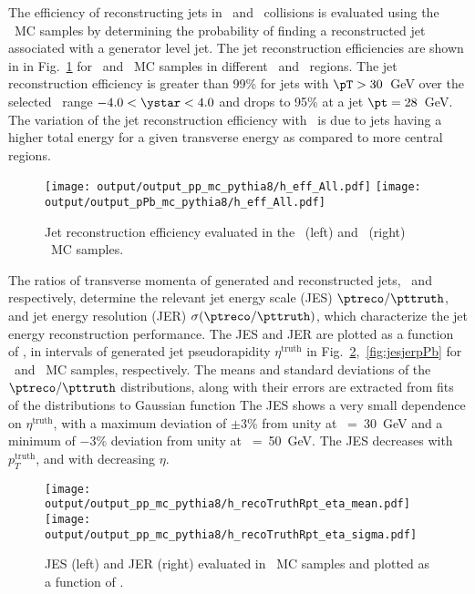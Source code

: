 The efficiency of reconstructing jets in \pp\ and \pPb\ collisions is evaluated using the \pythiaeight\ MC samples by determining the probability of finding a reconstructed jet associated with a generator level jet. The jet reconstruction efficiencies are shown in in Fig.~\ref{fig:jetrecoeff} for \pp\ and \pPb\ MC samples in different \ystar\ and \pT\ regions. The jet reconstruction efficiency is greater than 99\% for jets with $\pT>30$~GeV over the selected \ystar\ range $-4.0<\ystar<4.0$ and drops to 95\% at a jet $\pt = 28$~GeV. The variation of the jet reconstruction efficiency with \ystar\ is due to jets having a higher total energy for a given transverse energy as compared to more central regions.
  
\begin{figure}
	\centerline{
		\texttt{[image: output/output\_pp\_mc\_pythia8/h\_eff\_All.pdf]}
		\texttt{[image: output/output\_pPb\_mc\_pythia8/h\_eff\_All.pdf]}  
	}
	\caption{Jet reconstruction efficiency evaluated in the \pp\ (left) and \pPb\ (right) \pythiaeight\ MC samples.}
	\label{fig:jetrecoeff}
\end{figure}

\FloatBarrier

The ratios of transverse momenta of generated and reconstructed jets, \pttruth\ and \ptreco respectively, determine the relevant jet energy scale (JES) $\ptreco/\pttruth$, and jet energy resolution (JER) $\sigma(\ptreco/\pttruth)$, which characterize the jet energy reconstruction performance.  The JES and JER are plotted as a function of \pttruth, in intervals of generated jet pseudorapidity $\eta^{\mathrm{truth}}$ in Fig.~\ref{fig:jesjerpp},~\ref{fig:jesjerpPb} for \pp\ and \pPb\ MC samples, respectively. The means and standard deviations of the $\ptreco/\pttruth$ distributions, along with their errors are extracted from fits of the distributions to Gaussian function The JES shows a very small dependence on $\eta^{\mathrm{truth}}$, with a maximum deviation of $\pm 3\%$ from unity at \pttruth~=~30~GeV and a minimum of $-3\%$ deviation from unity at \pttruth~=~50~GeV. The JES decreases with $p_{T}^{\mathrm{truth}}$, and with decreasing $\eta$. 

\begin{figure}
	\centerline{
		\texttt{[image: output/output\_pp\_mc\_pythia8/h\_recoTruthRpt\_eta\_mean.pdf]} 
		\texttt{[image: output/output\_pp\_mc\_pythia8/h\_recoTruthRpt\_eta\_sigma.pdf]}
	}
	\caption{JES (left) and JER (right) evaluated in \pp\ MC samples and plotted as a function of \pttruth. }
	\label{fig:jesjerpp}
\end{figure}

